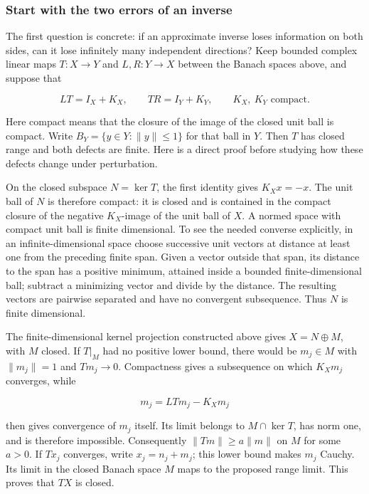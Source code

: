 \documentclass[
  11pt,
]{article}
\begin{document}
\subsubsection{Start with the two errors of an
inverse}\label{AN03-FRE-TWO-ERRORS}

The first question is concrete: if an approximate inverse loses
information on both sides, can it lose infinitely many independent
directions? Keep bounded complex linear maps \(T:X\to Y\) and
\(L,R:Y\to X\) between the Banach spaces above, and suppose that

\[
 LT=I_X+K_X,\qquad TR=I_Y+K_Y,\qquad K_X,\ K_Y\text{ compact}.
 \tag{F25}
\]

Here compact means that the closure of the image of the closed unit ball
is compact. Write \(B_Y=\{y\in Y:\|y\|\leq1\}\) for that ball in \(Y\).
Then \(T\) has closed range and both defects are finite. Here is a
direct proof before studying how these defects change under
perturbation.

On the closed subspace \(N=\ker T\), the first identity gives
\(K_Xx=-x\). The unit ball of \(N\) is therefore compact: it is closed
and is contained in the compact closure of the negative \(K_X\)-image of
the unit ball of \(X\). A normed space with compact unit ball is finite
dimensional. To see the needed converse explicitly, in an
infinite-dimensional space choose successive unit vectors at distance at
least one from the preceding finite span. Given a vector outside that
span, its distance to the span has a positive minimum, attained inside a
bounded finite-dimensional ball; subtract a minimizing vector and divide
by the distance. The resulting vectors are pairwise separated and have
no convergent subsequence. Thus \(N\) is finite dimensional.

The finite-dimensional kernel projection constructed above gives
\(X=N\oplus M\), with \(M\) closed. If \(T|_M\) had no positive lower
bound, there would be \(m_j\in M\) with \(\|m_j\|=1\) and \(Tm_j\to0\).
Compactness gives a subsequence on which \(K_Xm_j\) converges, while

\[
                 m_j=LTm_j-K_Xm_j                              \tag{F26}
\]

then gives convergence of \(m_j\) itself. Its limit belongs to
\(M\cap\ker T\), has norm one, and is therefore impossible. Consequently
\(\|Tm\|\geq a\|m\|\) on \(M\) for some \(a>0\). If \(Tx_j\) converges,
write \(x_j=n_j+m_j\); this lower bound makes \(m_j\) Cauchy. Its limit
in the closed Banach space \(M\) maps to the proposed range limit. This
proves that \(TX\) is closed.
\end{document}
